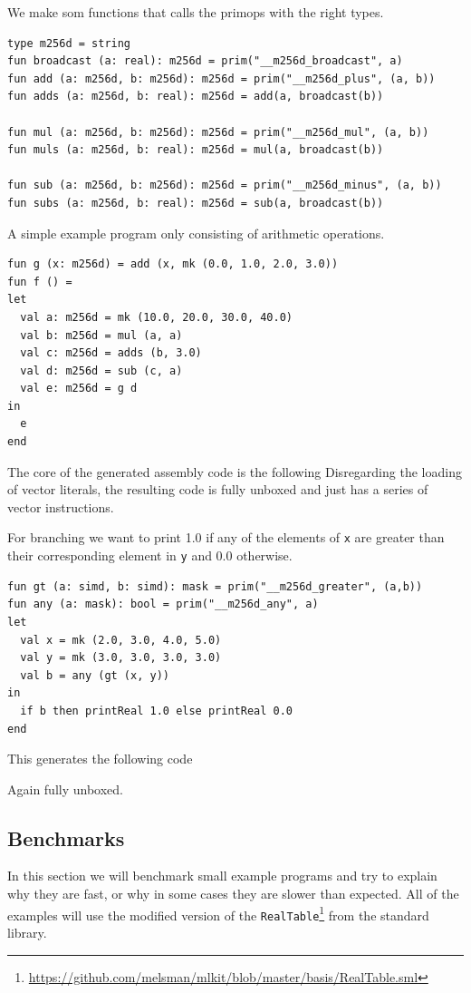 \documentclass{article}
\begin{document}
We make som functions that calls the primops with the right types.
\begin{lstlisting}
type m256d = string
fun broadcast (a: real): m256d = prim("__m256d_broadcast", a)
fun add (a: m256d, b: m256d): m256d = prim("__m256d_plus", (a, b))
fun adds (a: m256d, b: real): m256d = add(a, broadcast(b))

fun mul (a: m256d, b: m256d): m256d = prim("__m256d_mul", (a, b))
fun muls (a: m256d, b: real): m256d = mul(a, broadcast(b))

fun sub (a: m256d, b: m256d): m256d = prim("__m256d_minus", (a, b))
fun subs (a: m256d, b: real): m256d = sub(a, broadcast(b))
\end{lstlisting}
A simple example program only consisting of arithmetic operations.
\begin{lstlisting}
fun g (x: m256d) = add (x, mk (0.0, 1.0, 2.0, 3.0))
fun f () =
let
  val a: m256d = mk (10.0, 20.0, 30.0, 40.0)
  val b: m256d = mul (a, a)
  val c: m256d = adds (b, 3.0)
  val d: m256d = sub (c, a)
  val e: m256d = g d
in 
  e
end
\end{lstlisting}
The core of the generated assembly code is the following
Disregarding the loading of vector literals, the resulting code is fully unboxed and just has a series of vector instructions.

For branching we want to print 1.0 if any of the elements of \verb!x! are greater than their corresponding element in \verb!y! and 0.0 otherwise.

\begin{lstlisting}
fun gt (a: simd, b: simd): mask = prim("__m256d_greater", (a,b))
fun any (a: mask): bool = prim("__m256d_any", a)
let
  val x = mk (2.0, 3.0, 4.0, 5.0)
  val y = mk (3.0, 3.0, 3.0, 3.0)
  val b = any (gt (x, y))
in 
  if b then printReal 1.0 else printReal 0.0
end
\end{lstlisting}

This generates the following code

Again fully unboxed.

\subsection{Benchmarks}

In this section we will benchmark small example programs and try to explain why they are fast, or why in some cases they are slower than expected. All of the examples will use the modified version of the \texttt{RealTable}\footnote{\url{https://github.com/melsman/mlkit/blob/master/basis/RealTable.sml}} from the standard library.
\end{document}
